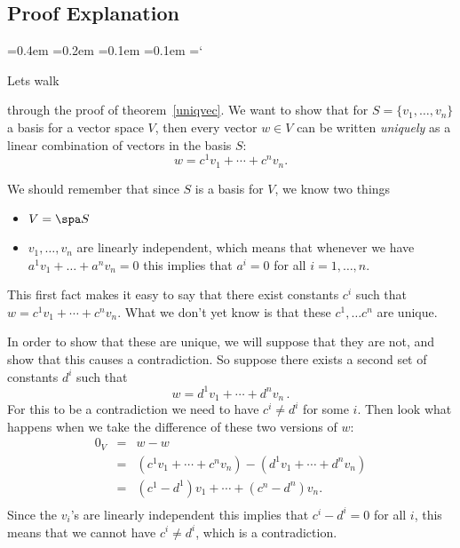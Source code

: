 
\subsection*{Proof Explanation}

{\ttfamily
{}\font=0.4em
\font=0.2em
\font=0.1em
\font=0.1em
\hyphenchar\font=`\-


\hypertarget{basis_and_dimension_thm}{Lets walk } through the proof of theorem~\ref{uniqvec}. We want to show that for $S=\{v_1, \ldots, v_n \}$ a basis for a vector space $V$, then every vector $w \in V$ can be written \emph{uniquely} as a linear combination of vectors in the basis $S$:
\[
w=c^1v_1+\cdots + c^nv_n.
\]

We should remember that since $S$ is a basis for $V$, we know two things
\begin{itemize}
\item $V = \spa S$
\item $ v_1, \ldots , v_n$ are linearly independent, which means that whenever we have 
$
a^1v_1+ \ldots + a^n v_n = 0
$
this implies that $a^i =0$ for all $i=1, \ldots, n$.
\end{itemize}
This first fact makes it easy to say that there exist constants $c^i$ such that $w=c^1v_1+\cdots + c^nv_n$. What we don't yet know is that these $c^1, \ldots c^n$ are unique.

 In order to show that these are unique, we will suppose that they are not, and show that this causes a contradiction. So suppose there exists a second set of constants $d^i$ such that 
\[w=d^1v_1+\cdots + d^nv_n\, .\] 
For this to be a contradiction we need to have $c^i \neq d^i$ for some $i$. Then look what happens when we take the difference of these two versions of $w$:
\begin{eqnarray*}
0_V&=&w-w\\
&=&(c^1v_1+\cdots + c^nv_n)-(d^1v_1+\cdots + d^nv_n )\\
&=&(c^1-d^1)v_1+\cdots + (c^n-d^n)v_n. \\
\end{eqnarray*}
Since the $v_i$'s are linearly independent this implies that $c^i - d^i = 0$ for all $i$, this means that we cannot have $c^i \neq d^i$, which is a contradiction.



} %

